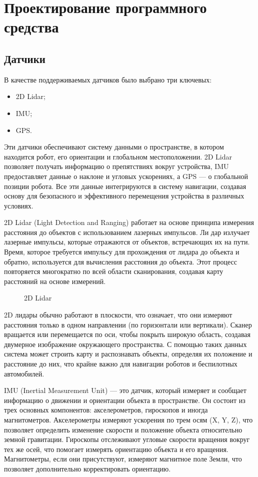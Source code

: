 	\section{Проектирование программного средства}


\subsection{Датчики}
В качестве поддерживаемых датчиков было выбрано три ключевых:
\begin{itemize}
	\item 2D Lidar;
	\item IMU;
	\item GPS.
\end{itemize}

Эти датчики обеспечивают систему данными о пространстве, в котором находится
робот, его ориентации и глобальном местоположении.
2D Lidar позволяет получать информацию о препятствиях вокруг устройства, IMU
предоставляет данные о наклоне и угловых ускорениях, а GPS — о глобальной
позиции робота. Все эти данные интегрируются в систему навигации, создавая
основу для безопасного и эффективного перемещения устройства в различных
условиях.

2D Lidar (Light Detection and Ranging) работает на основе принципа измерения
расстояния до объектов с использованием лазерных импульсов. Ли дар излучает
лазерные импульсы, которые отражаются от объектов, встречающих их на пути.
Время, которое требуется импульсу для прохождения от лидара до объекта и
обратно, используется для вычисления расстояния до объекта. Этот процесс
повторяется многократно по всей области сканирования, создавая карту расстояний
на основе измерений.

\begin{figure}[h]
\centering
\caption{2D Lidar}
\end{figure}

2D лидары обычно работают в плоскости, что означает, что они измеряют расстояния
только в одном направлении (по горизонтали или вертикали). Сканер вращается или
перемещается по оси, чтобы покрыть широкую область, создавая двумерное
изображение окружающего пространства. С помощью таких данных система может
строить карту и распознавать объекты, определяя их положение и расстояние до
них, что крайне важно для навигации роботов и беспилотных автомобилей.

IMU (Inertial Measurement Unit) — это датчик, который измеряет и сообщает
информацию о движении и ориентации объекта в пространстве. Он состоит из трех
основных компонентов: акселерометров, гироскопов и иногда магнитометров.
Акселерометры измеряют ускорения по трем осям (X, Y, Z), что позволяет
определить изменение скорости и положение объекта относительно земной
гравитации. Гироскопы отслеживают угловые скорости вращения вокруг тех же осей,
что помогает измерять ориентацию объекта и его вращения. Магнитометры, если они
присутствуют, измеряют магнитное поле Земли, что позволяет дополнительно
корректировать ориентацию.

